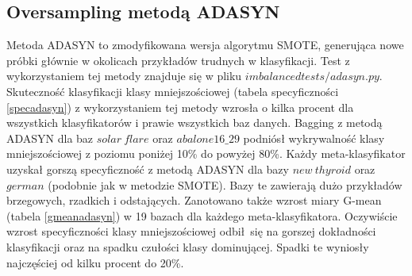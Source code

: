 \subsection{Oversampling metodą ADASYN}
Metoda ADASYN to zmodyfikowana wersja algorytmu SMOTE, generująca nowe próbki głównie w okolicach przykładów trudnych w klasyfikacji. Test z wykorzystaniem tej metody znajduje się w pliku $imbalancedtests/adasyn.py$. Skuteczność klasyfikacji klasy mniejszościowej (tabela specyficzności \ref{specadasyn}) z wykorzystaniem tej metody wzrosła o kilka procent dla wszystkich klasyfikatorów i prawie wszystkich baz danych. Bagging z metodą ADASYN dla baz $solar\: flare$ oraz $abalone16\_29$ podniósł wykrywalność klasy mniejszościowej z poziomu poniżej 10\% do powyżej 80\%. Każdy meta-klasyfikator uzyskał gorszą specyficzność z metodą ADASYN dla bazy $new\: thyroid$ oraz $german$ (podobnie jak w metodzie SMOTE). Bazy te zawierają dużo przykładów brzegowych, rzadkich i odstających. Zanotowano także wzrost miary G-mean (tabela \ref{gmeanadasyn}) w 19 bazach dla każdego meta-klasyfikatora. Oczywiście wzrost specyficzności klasy mniejszościowej odbił się na gorszej dokładności klasyfikacji oraz na spadku czułości klasy dominującej. Spadki te wyniosły najczęściej od kilku procent do 20\%.
